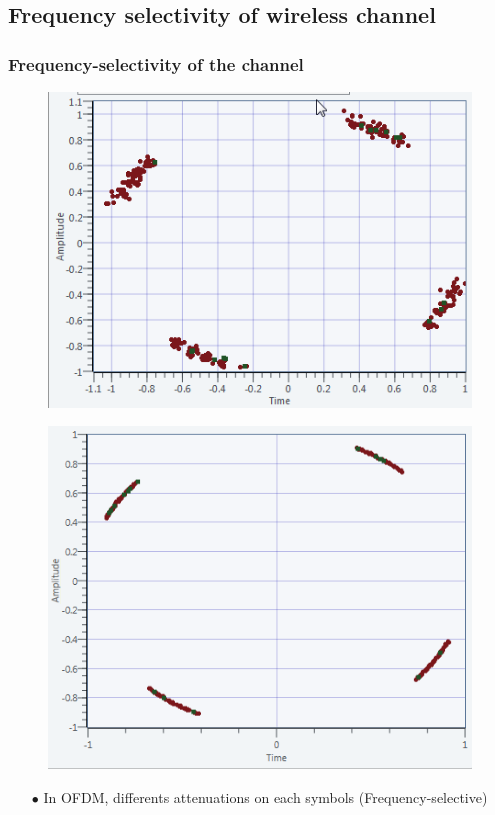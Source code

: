 \documentclass[11pt]{beamer}
\begin{document}
\subsection{Frequency selectivity of wireless channel}
\begin{frame}
\frametitle{Frequency-selectivity of the channel}

\begin{figure}[!ht]
    \begin{minipage}[b]{0.48\linewidth}
        \centering \includegraphics[scale=0.41]{img/multicarrier_200hz.png}
     \label{fig6}
    \end{minipage}\hfill
    \begin{minipage}[b]{0.48\linewidth}
         \centering \includegraphics[scale=0.35]{img/SingleCarrier_Offset_200}
\label{fig7}
    \end{minipage}
\end{figure}

\begin{itemize}
\item[$\bullet$] In OFDM, differents attenuations on each symbols (Frequency-selective)
\end{itemize}
\end{frame}
\end{document}
